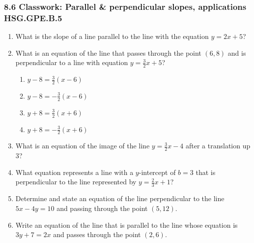 

\fancyhead[LE]{\thepage}



\subsubsection*{8.6 Classwork: Parallel \& perpendicular slopes, applications \hfill HSG.GPE.B.5}
\begin{enumerate}[itemsep=2cm]
\item What is the slope of a line parallel to the line with the equation $y=2x+5$?

\item What is an equation of the line that passes through the point $(6,8)$ and is perpendicular to a line with equation $y=\frac{3}{2}x+5$?
  \begin{multicols}{2}
    \begin{enumerate}
      \item $y-8=\frac{3}{2}(x-6)$
      \item $y-8=-\frac{3}{2}(x-6)$ 
      \item $y+8=\frac{3}{2}(x+6)$
      \item $y+8=-\frac{3}{2}(x+6)$
    \end{enumerate}
  \end{multicols}

\item What is an equation of the image of the line $\displaystyle y=\frac{3}{2}x-4$ after a translation up 3?

\item What equation represents a line with a $y$-intercept of $b=3$ that is perpendicular to the line represented by $\displaystyle y=\frac{2}{3}x+1$?
    
\item Determine and state an equation of the line perpendicular to the line\\ $5x-4y=10$ and passing through the point $(5,12)$. \vspace{1cm}

\item Write an equation of the line that is parallel to the line whose equation is $3y+7=2x$ and passes through the point $(2,6)$. \vspace{1cm}


\end{enumerate}
